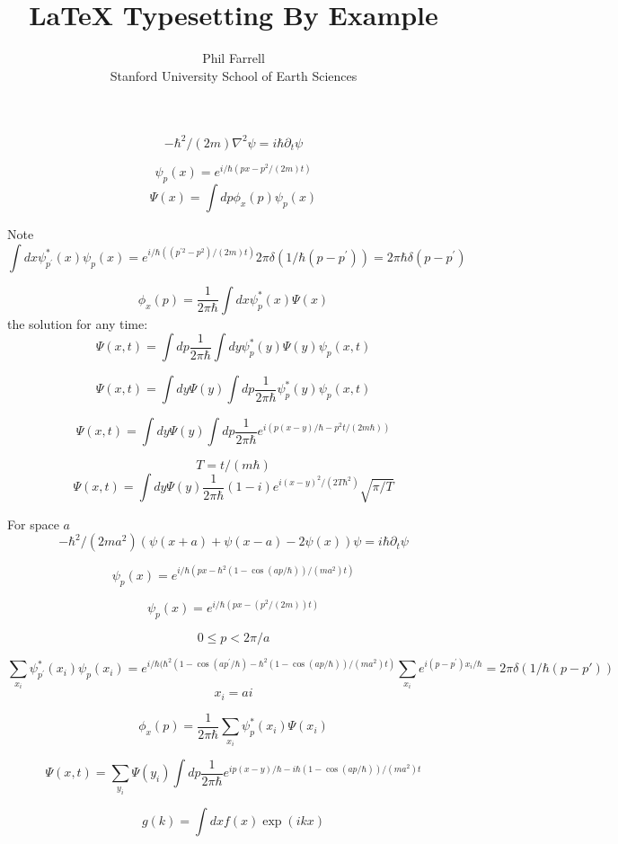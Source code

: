 \documentclass[12pt,twoside]{article}
\begin{document}
\title{LaTeX Typesetting By Example}
\author{Phil Farrell\\
Stanford University School of Earth Sciences}

\renewcommand{\today}{November 2, 1994}
\maketitle

$$
-\hbar^2/(2m) \nabla^2 \psi = i \hbar \partial_t \psi
$$

$$
\psi_p(x) = e^{ i/\hbar (p x - p^2 /(2m)t)}
$$
$$
\Psi(x) = \int dp \phi_x(p) \psi_p(x)
$$

Note
$$
\int dx \psi_{p^\prime}^*(x) \psi_{p}(x) = e^{ i/\hbar ((p^{\prime2} - p^2) /(2m)t)} 2\pi\delta(1/\hbar(p-p^\prime))
=2\pi\hbar\delta(p-p^\prime)
$$

$$
\phi_x(p) = \frac{1}{2\pi\hbar}\int dx \psi^*_p(x) \Psi(x)
$$
the solution for any time:
$$
\Psi(x, t) = \int dp \frac{1}{2\pi\hbar}\int dy \psi^*_p(y) \Psi(y) \psi_p(x,t)
$$

$$
\Psi(x, t) = \int dy  \Psi(y) \int dp \frac{1}{2\pi\hbar}\psi^*_p(y) \psi_p(x,t)
$$

$$
\Psi(x, t) = \int dy  \Psi(y) \int dp \frac{1}{2\pi\hbar} e^{i(p(x-y)/\hbar - p^2 t/(2m\hbar))}
$$

$$
T=t/(m\hbar)
$$
$$
\Psi(x, t) = \int dy  \Psi(y) \frac{1}{2\pi\hbar} (1-i) e^{i (x-y)^2 / (2 T \hbar^2)}  \sqrt{\pi / T}
$$


For space $a$
$$
-\hbar^2/(2m a^2) (\psi(x+a) + \psi(x-a) - 2\psi(x)) \psi = i \hbar \partial_t \psi
$$

$$
\psi_p(x) = e^{ i/\hbar (p x - \hbar^2(1 - \cos(a p/\hbar))/(m a^2)t)}
$$

$$
\psi_p(x) = e^{ i/\hbar (p x - (p^2/(2m))t)}
$$

$$
0 \le p < 2\pi / a
$$

$$
\sum_{x_i} \psi_{p^\prime}^*(x_i) \psi_{p}(x_i) = e^{ i/\hbar (\hbar^2(1 - \cos(a p^\prime/\hbar) - \hbar^2(1 - \cos(a p/\hbar))/(m a^2)t)}
\sum_{x_i}e^{i(p-p^\prime)x_i/\hbar} = 2\pi\delta(1/\hbar(p - p\prime))
$$
$$
x_i = ai
$$

$$
\phi_x(p) = \frac{1}{2\pi\hbar}\sum_{x_i} \psi^*_p(x_i) \Psi(x_i)
$$

$$
\Psi(x, t) = \sum_{y_i} \Psi(y_i) \int dp \frac{1}{2\pi\hbar} e^{ ip(x-y)/\hbar - i\hbar(1 - \cos(a p/\hbar))/(m a^2)t}
$$



$$
g(k) = \int dx f(x) \exp(ikx)
$$
\end{document}
